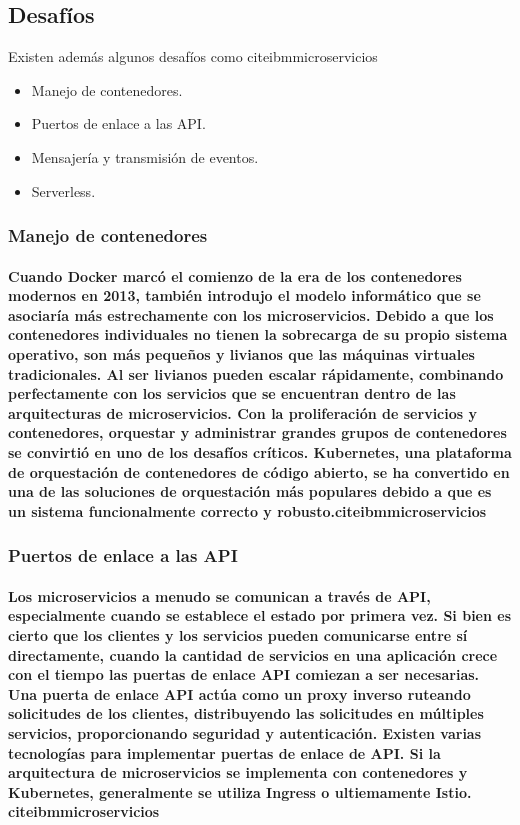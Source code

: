 \subsection{Desafíos}
Existen además algunos desafíos como cite{ibmmicroservicios}
\begin{itemize}
    \item Manejo de contenedores.
    \item Puertos de enlace a las API.
    \item Mensajería y transmisión de eventos.
    \item Serverless.
\end{itemize}

\subsubsection{Manejo de contenedores}
\paragraph{
    Cuando Docker marcó el comienzo de la era de los contenedores modernos en 2013, también introdujo el modelo informático que se asociaría más estrechamente con los microservicios. Debido a que los contenedores individuales no tienen la sobrecarga de su propio sistema operativo, son más pequeños y livianos que las máquinas virtuales tradicionales. Al ser livianos pueden escalar rápidamente, combinando perfectamente con los servicios que se encuentran dentro de las arquitecturas de microservicios.
    Con la proliferación de servicios y contenedores, orquestar y administrar grandes grupos de contenedores se convirtió en uno de los desafíos críticos. Kubernetes, una plataforma de orquestación de contenedores de código abierto, se ha convertido en una de las soluciones de orquestación más populares debido a que es un sistema funcionalmente correcto y robusto.cite{ibmmicroservicios}
}

\subsubsection{Puertos de enlace a las API}
\paragraph{
    Los microservicios a menudo se comunican a través de API, especialmente cuando se establece el estado por primera vez. Si bien es cierto que los clientes y los servicios pueden comunicarse entre sí directamente, cuando la cantidad de servicios en una aplicación crece con el tiempo las puertas de enlace API comiezan a ser necesarias. Una puerta de enlace API actúa como un proxy inverso ruteando solicitudes de los clientes, distribuyendo las solicitudes en múltiples servicios, proporcionando seguridad y autenticación.
    Existen varias tecnologías para implementar puertas de enlace de API. Si la arquitectura de microservicios se implementa con contenedores y Kubernetes, generalmente se utiliza Ingress o ultiemamente Istio.
    cite{ibmmicroservicios}
}

